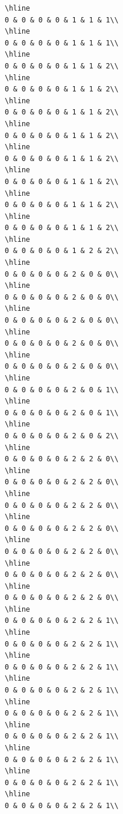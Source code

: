 \documentclass[
]{article}
\begin{document}
\begin{verbatim}
\hline
0 & 0 & 0 & 0 & 1 & 1 & 1\\
\hline
0 & 0 & 0 & 0 & 1 & 1 & 1\\
\hline
0 & 0 & 0 & 0 & 1 & 1 & 2\\
\hline
0 & 0 & 0 & 0 & 1 & 1 & 2\\
\hline
0 & 0 & 0 & 0 & 1 & 1 & 2\\
\hline
0 & 0 & 0 & 0 & 1 & 1 & 2\\
\hline
0 & 0 & 0 & 0 & 1 & 1 & 2\\
\hline
0 & 0 & 0 & 0 & 1 & 1 & 2\\
\hline
0 & 0 & 0 & 0 & 1 & 1 & 2\\
\hline
0 & 0 & 0 & 0 & 1 & 1 & 2\\
\hline
0 & 0 & 0 & 0 & 1 & 2 & 2\\
\hline
0 & 0 & 0 & 0 & 2 & 0 & 0\\
\hline
0 & 0 & 0 & 0 & 2 & 0 & 0\\
\hline
0 & 0 & 0 & 0 & 2 & 0 & 0\\
\hline
0 & 0 & 0 & 0 & 2 & 0 & 0\\
\hline
0 & 0 & 0 & 0 & 2 & 0 & 0\\
\hline
0 & 0 & 0 & 0 & 2 & 0 & 1\\
\hline
0 & 0 & 0 & 0 & 2 & 0 & 1\\
\hline
0 & 0 & 0 & 0 & 2 & 0 & 2\\
\hline
0 & 0 & 0 & 0 & 2 & 2 & 0\\
\hline
0 & 0 & 0 & 0 & 2 & 2 & 0\\
\hline
0 & 0 & 0 & 0 & 2 & 2 & 0\\
\hline
0 & 0 & 0 & 0 & 2 & 2 & 0\\
\hline
0 & 0 & 0 & 0 & 2 & 2 & 0\\
\hline
0 & 0 & 0 & 0 & 2 & 2 & 0\\
\hline
0 & 0 & 0 & 0 & 2 & 2 & 0\\
\hline
0 & 0 & 0 & 0 & 2 & 2 & 1\\
\hline
0 & 0 & 0 & 0 & 2 & 2 & 1\\
\hline
0 & 0 & 0 & 0 & 2 & 2 & 1\\
\hline
0 & 0 & 0 & 0 & 2 & 2 & 1\\
\hline
0 & 0 & 0 & 0 & 2 & 2 & 1\\
\hline
0 & 0 & 0 & 0 & 2 & 2 & 1\\
\hline
0 & 0 & 0 & 0 & 2 & 2 & 1\\
\hline
0 & 0 & 0 & 0 & 2 & 2 & 1\\
\hline
0 & 0 & 0 & 0 & 2 & 2 & 1\\

\end{verbatim}
\end{document}
